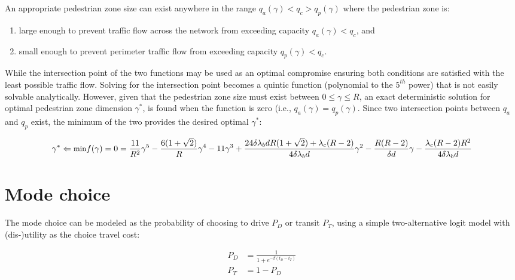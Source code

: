 \documentclass{article}
\begin{document}
An appropriate pedestrian zone size can exist anywhere in the range $q_a(\gamma) < q_c > q_p(\gamma)$ where the pedestrian zone is:
\begin{enumerate}[label=(\alph*)]
    \item large enough to prevent traffic flow across the network from exceeding capacity $q_a(\gamma) < q_c$, and 
    \item small enough to prevent perimeter traffic flow from exceeding capacity $q_p(\gamma) < q_c$. 
\end{enumerate}

While the intersection point of the two functions may be used as an optimal compromise ensuring both conditions are satisfied with the least possible traffic flow. Solving for the intersection point becomes a quintic function (polynomial to the $5^{th}$ power) that is not easily solvable analytically. However, given that the pedestrian zone size must exist between $0 \leq \gamma \leq R$, an exact deterministic solution for optimal pedestrian zone dimension $\gamma^*$, is found when the function is zero (i.e., $q_a(\gamma) = q_p(\gamma)$. Since two intersection points between $q_a$ and $q_p$ exist, the minimum of the two provides the desired optimal $\gamma^*$:

\begin{equation}\small
\gamma^* \Leftarrow \text{min} f(\gamma) = 0 = \frac{11}{R^2} \gamma^5 - \frac{6(1+\sqrt{2})}{R}\gamma^4 - 11\gamma^3 + \frac{24\delta\lambda_b d R(1+\sqrt{2}) + \lambda_{c}(R-2)}{4\delta\lambda_{b}d}\gamma^{2} - \frac{R(R-2)}{\delta d}\gamma - \frac{\lambda_{c}(R-2)R^{2}}{4\delta\lambda_{b}d}
\end{equation}


\section{Mode choice}

The mode choice can be modeled as the probability of choosing to drive $P_D$ or transit $P_T$, using a simple two-alternative logit model with (dis-)utility as the choice travel cost:

\begin{subequations}
    \label{eq:choiceprob}
    \begin{align}
        P_D & = \frac{1}{1+e^{-\beta (t_D-t_T)}}\\
        P_T & = 1 - P_D
    \end{align}
\end{subequations}
\end{document}
